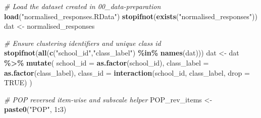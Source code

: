\documentclass[
  10pt,
]{article}
\newenvironment{Shaded}{\begin{snugshade}}{\end{snugshade}}
\newcommand{\AttributeTok}[1]{\textcolor[rgb]{0.13,0.29,0.53}{#1}}
\newcommand{\CommentTok}[1]{\textcolor[rgb]{0.56,0.35,0.01}{\textit{#1}}}
\newcommand{\ConstantTok}[1]{\textcolor[rgb]{0.56,0.35,0.01}{#1}}
\newcommand{\DecValTok}[1]{\textcolor[rgb]{0.00,0.00,0.81}{#1}}
\newcommand{\FunctionTok}[1]{\textcolor[rgb]{0.13,0.29,0.53}{\textbf{#1}}}
\newcommand{\NormalTok}[1]{#1}
\newcommand{\OtherTok}[1]{\textcolor[rgb]{0.56,0.35,0.01}{#1}}
\newcommand{\SpecialCharTok}[1]{\textcolor[rgb]{0.81,0.36,0.00}{\textbf{#1}}}
\newcommand{\StringTok}[1]{\textcolor[rgb]{0.31,0.60,0.02}{#1}}
\begin{document}
\begin{Shaded}
\begin{Highlighting}[]
\CommentTok{\# Load the dataset created in 00\_data{-}preparation}
\FunctionTok{load}\NormalTok{(}\StringTok{"normalised\_responses.RData"}\NormalTok{)}
\FunctionTok{stopifnot}\NormalTok{(}\FunctionTok{exists}\NormalTok{(}\StringTok{"normalised\_responses"}\NormalTok{))}
\NormalTok{dat }\OtherTok{\textless{}{-}}\NormalTok{ normalised\_responses}

\CommentTok{\# Ensure clustering identifiers and unique class id}
\FunctionTok{stopifnot}\NormalTok{(}\FunctionTok{all}\NormalTok{(}\FunctionTok{c}\NormalTok{(}\StringTok{"school\_id"}\NormalTok{,}\StringTok{"class\_label"}\NormalTok{) }\SpecialCharTok{\%in\%} \FunctionTok{names}\NormalTok{(dat)))}
\NormalTok{dat }\OtherTok{\textless{}{-}}\NormalTok{ dat }\SpecialCharTok{\%\textgreater{}\%}
  \FunctionTok{mutate}\NormalTok{(}
    \AttributeTok{school\_id   =} \FunctionTok{as.factor}\NormalTok{(school\_id),}
    \AttributeTok{class\_label =} \FunctionTok{as.factor}\NormalTok{(class\_label),}
    \AttributeTok{class\_id    =} \FunctionTok{interaction}\NormalTok{(school\_id, class\_label, }\AttributeTok{drop =} \ConstantTok{TRUE}\NormalTok{)}
\NormalTok{  )}

\CommentTok{\# POP reversed item{-}wise and subscale helper}
\NormalTok{POP\_rev\_items }\OtherTok{\textless{}{-}} \FunctionTok{paste0}\NormalTok{(}\StringTok{"POP"}\NormalTok{, }\DecValTok{1}\SpecialCharTok{:}\DecValTok{3}\NormalTok{)}


\end{Highlighting}
\end{Shaded}
\end{document}
